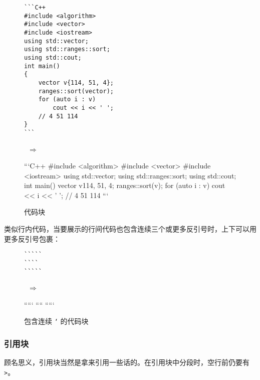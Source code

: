 \documentclass[a4paper,fontset=none]{ctexart}
\begin{document}
\begin{figure}[H]
    \centering
    \begin{minipage}{0.45\textwidth}
        \begin{verbatim}
```C++
#include <algorithm>
#include <vector>
#include <iostream>
using std::vector;
using std::ranges::sort;
using std::cout;
int main()
{
    vector v{114, 51, 4};
    ranges::sort(vector);
    for (auto i : v)
        cout << i << ' ';
    // 4 51 114
}
```
        \end{verbatim}
    \end{minipage}
    \, $\Longrightarrow$ \,
    \begin{minipage}{0.45\textwidth}
\begin{markdown}
```C++
#include <algorithm>
#include <vector>
#include <iostream>
using std::vector;
using std::ranges::sort;
using std::cout;
int main()
{
    vector v{114, 51, 4};
    ranges::sort(v);
    for (auto i : v)
        cout << i << ' ';
    // 4 51 114
}
```
\end{markdown}
    \end{minipage}
    \caption{代码块}
\end{figure}

类似行内代码，当要展示的行间代码也包含连续三个或更多反引号时，上下可以用更多反引号包裹：

\begin{figure}[H]
    \centering
    \begin{minipage}{0.45\textwidth}
        \begin{verbatim}
`````
````
`````
        \end{verbatim}
    \end{minipage}
    \, $\Longrightarrow$ \,
    \begin{minipage}{0.45\textwidth}
\begin{markdown}
`````
````
`````
\end{markdown}
    \end{minipage}
    \caption{包含连续 \texttt{`} 的代码块}
\end{figure}

\subsubsection{引用块}

顾名思义，引用块当然是拿来引用一些话的。在引用块中分段时，空行前仍要有 \verb|>|。
\end{document}
